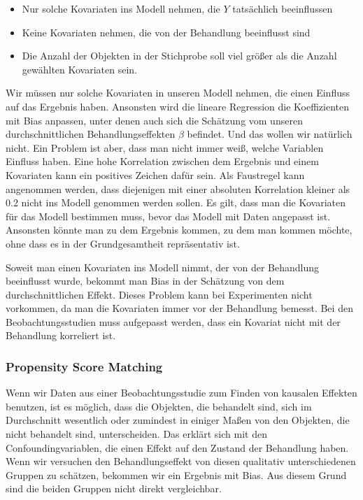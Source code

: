 \documentclass[12pt,a4paper,twoside]{scrartcl}
\numberwithin{equation}{section}
\begin{document}
\begin{itemize}
  \item Nur solche Kovariaten ins Modell nehmen, die $Y$ tatsächlich beeinflussen 
  \item Keine Kovariaten nehmen, die von der Behandlung beeinflusst sind
  \item Die Anzahl der Objekten in der Stichprobe soll viel größer als die Anzahl gewählten Kovariaten sein.
\end{itemize}

\noindent
Wir müssen nur solche Kovariaten in unseren Modell nehmen, die einen Einfluss auf das Ergebnis haben. Ansonsten wird die lineare Regression die Koeffizienten mit Bias anpassen, unter denen auch sich die Schätzung vom unseren durchschnittlichen Behandlungseffekten $\beta$ befindet. Und das wollen wir natürlich nicht. Ein Problem ist aber, dass man nicht immer weiß, welche Variablen Einfluss haben. Eine hohe Korrelation zwischen dem Ergebnis und einem Kovariaten kann ein positives Zeichen dafür sein. Als Faustregel kann angenommen werden, dass diejenigen mit einer absoluten Korrelation kleiner als 0.2 nicht ins Modell genommen werden sollen. Es gilt, dass man die Kovariaten für das Modell bestimmen muss, bevor das Modell mit Daten angepasst ist. Ansonsten könnte man zu dem Ergebnis kommen, zu dem man kommen möchte, ohne dass es in der Grundgesamtheit repräsentativ ist\cite{cox1982biometrics}\cite{WinLin}. \par

\noindent
Soweit man einen Kovariaten ins Modell nimmt, der von der Behandlung beeinflusst wurde, bekommt man Bias in der Schätzung von dem durchschnittlichen Effekt. Dieses Problem kann bei Experimenten nicht vorkommen, da man die Kovariaten immer vor der Behandlung bemesst. Bei den Beobachtungsstudien muss aufgepasst werden, dass ein Kovariat nicht mit der Behandlung korreliert ist.\cite{LinDol}\par

\subsubsection{Propensity Score Matching}\label{subsubsec:propensityScoreMatching}
Wenn wir Daten aus einer Beobachtungsstudie zum Finden von kausalen Effekten benutzen, ist es möglich, dass die Objekten, die behandelt sind, sich im Durchschnitt wesentlich oder zumindest in einiger Maßen von den Objekten, die nicht behandelt sind, unterscheiden. Das erklärt sich mit den Confoundingvariablen, die einen Effekt auf den Zustand der Behandlung haben. Wenn wir versuchen den Behandlungseffekt von diesen qualitativ unterschiedenen Gruppen zu schätzen, bekommen wir ein Ergebnis mit Bias. Aus diesem Grund sind die beiden Gruppen nicht direkt vergleichbar.\par
\end{document}
